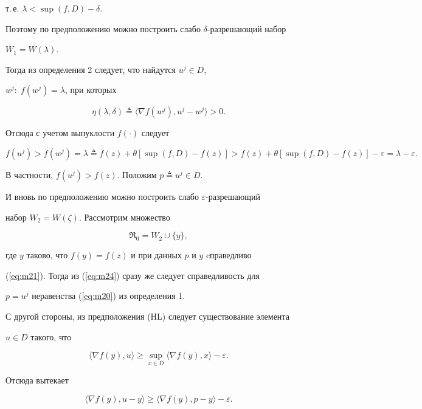 т.\,е. $\lambda < \sup(f,D)- \delta$.


Поэтому по предположению можно построить слабо $\delta$-разрешающий набор 


$ W_{1}=W(\lambda)$.


Тогда из определения 2 следует, что найдутся $u^{j} \in D$, 


$w^{j}:\; f(w^{j})=\lambda$, при которых


$$


\eta (\lambda,\delta)\triangleq


\langle \nabla f(w^{j}),u^{j}-w^{j} \rangle >0.


$$ 


Отсюда с учетом выпуклости $f(\cdot)$ следует


\begin{equation}


f(u^{j})>f(w^{j})=\lambda\triangleq f(z)+\theta[\sup(f,D)-f(z)]>


f(z)+\theta[\sup(f,D)-f(z)]-\varepsilon=\lambda-\varepsilon.


\label{eq:m24}


\end{equation}


В частности, $f(u^{j})>f(z)$. Положим $p\triangleq u^{j} \in D$.


И вновь по предположению можно построить слабо $\varepsilon$-разрешающий


набор $W_{2}=W(\zeta)$. Рассмотрим множество


$$


\Re_{0}=W_{2}\cup \{ y \},


$$


где $y$ таково, что $f(y)=f(z)$ и при данных $p$ и $y$ cправедливо


(\ref{eq:m21}). Тогда из (\ref{eq:m24}) сразу же следует справедливость для


$p=u^j$ неравенства (\ref{eq:m20}) из определения 1.


С другой стороны, из предположения (HL) следует существование элемента


$u \in D$ такого, что 


$$


\langle \nabla f(y),u \rangle \geq 


\sup_{x \in D}\langle \nabla f(y),x \rangle - \varepsilon.


$$


Отсюда вытекает


\begin{equation}


\langle \nabla f(y),u-y \rangle \geq


\langle \nabla f(y),p-y \rangle - \varepsilon.


\label{eq:m25}


\end{equation}





